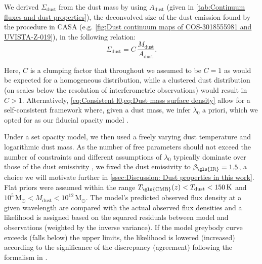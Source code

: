 We derived $\Sigma_\text{dust}$ from the dust mass by using $A_\text{dust}$ (given in \cref{tab:Continuum fluxes and dust properties}), the deconvolved size of the dust emission found by the  procedure in \gls{CASA} (e.g. \cref{fig:Dust continuum maps of COS-3018555981 and UVISTA-Z-019}), in the following relation:
\begin{equation}
    \label{eq:Dust mass surface density}
    \Sigma_\text{dust} = C \, \frac{M_\text{dust}}{A_\text{dust}}.
\end{equation}

Here, $C$ is a clumping factor that throughout we assumed to be $C = 1$ as would be expected for a homogeneous distribution, while a clustered dust distribution (on scales below the resolution of interferometric observations) would result in $C > 1$. Alternatively, \cref{eq:Consistent l0,eq:Dust mass surface density} allow for a self-consistent framework where, given a dust mass, we infer $\lambda_0$ a priori, which we opted for as our fiducial opacity model .

Under a set opacity model, we then used a freely varying dust temperature and logarithmic dust mass. As the number of free parameters should not exceed the number of constraints and different assumptions of $\lambda_0$ typically dominate over those of the dust emissivity \citep{2014PhR...541...45C}, we fixed the dust emissivity to $\beta_\text{\gls{IR}} = 1.5$, a choice we will motivate further in \cref{ssec:Discussion: Dust properties in this work}. Flat priors were assumed within the range $T_\text{\gls{CMB}}(z) < T_\text{dust} < 150 \, \mathrm{K}$ and $10^5 \, \mathrm{M_\odot} < M_\text{dust} < 10^{12} \, \mathrm{M_\odot}$. The model's predicted observed flux density at a given wavelength are compared with the actual observed flux densities and a likelihood is assigned based on the squared residuals between model and observations (weighted by the inverse variance). If the model greybody curve exceeds (falls below) the upper limits, the likelihood is lowered (increased) according to the significance of the discrepancy (agreement) following the formalism in \citet{2012PASP..124.1208S}.

